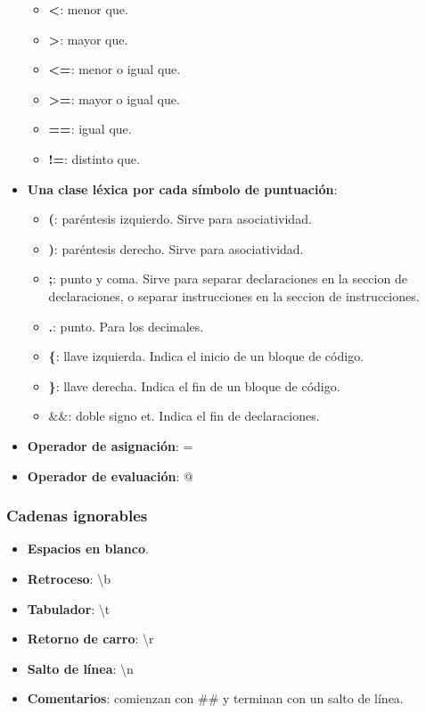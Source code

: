 \documentclass[11pt]{article}
\begin{document}
\begin{itemize}
\begin{itemize}
                    \item \textbf{\textless}: menor que.
                    \item \textbf{\textgreater}: mayor que.
                    \item \textbf{\textless=}: menor o igual que.
                    \item \textbf{\textgreater=}: mayor o igual que.
                    \item \textbf{==}: igual que.
                    \item \textbf{!=}: distinto que.
                \end{itemize}
            \item \textbf{Una clase léxica por cada símbolo de puntuación}:
                \begin{itemize}
                    \item \textbf{(}: paréntesis izquierdo. Sirve para asociatividad.
                    \item \textbf{)}: paréntesis derecho. Sirve para asociatividad.
                    \item \textbf{;}: punto y coma. Sirve para separar declaraciones en la seccion de declaraciones, o separar instrucciones en la seccion de instrucciones. 
                    \item \textbf{.}: punto. Para los decimales.
                    \item \textbf{\{}: llave izquierda. Indica el inicio de un bloque de código.
                    \item \textbf{\}}: llave derecha. Indica el fin de un bloque de código.
                    \item \textbf{$\&\&$}: doble signo et. Indica el fin de declaraciones.
                \end{itemize}
            \item \textbf{Operador de asignación}: =
            \item \textbf{Operador de evaluación}: @
        \end{itemize}
        \subsubsection*{Cadenas ignorables}
        \begin{itemize}
            \item \textbf{Espacios en blanco}.
            \item \textbf{Retroceso}: \textbackslash b
            \item \textbf{Tabulador}: \textbackslash t
            \item \textbf{Retorno de carro}: \textbackslash r
            \item \textbf{Salto de línea}: \textbackslash n
            \item \textbf{Comentarios}: comienzan con \#\# y terminan con un salto de línea.
        \end{itemize}
\end{document}
